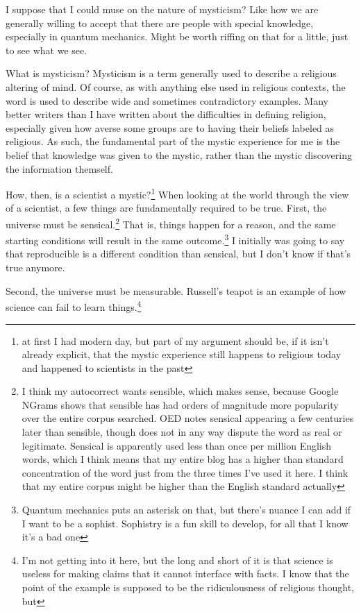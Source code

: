 \documentclass[12pt]{article}[titlepage]
\renewcommand{\,}{\textsuperscript{,}}
\begin{document}
I suppose that I could muse on the nature of mysticism?
Like how we are generally willing to accept that there are people with special knowledge, especially in quantum mechanics.
Might be worth riffing on that for a little, just to see what we see.

What is mysticism?
Mysticism is a term generally used to describe a religious altering of mind.
Of course, as with anything else used in religious contexts, the word is used to describe wide and sometimes contradictory examples.
Many better writers than I have written about the difficulties in defining religion, especially given how averse some groups are to having their beliefs labeled as religious.
As such, the fundamental part of the mystic experience for me is the belief that knowledge was given to the mystic, rather than the mystic discovering the information themself.

How, then, is a scientist a mystic?\footnote{at first I had modern day, but part of my argument should be, if it isn't already explicit, that the mystic experience still happens to religious today and happened to scientists in the past}
When looking at the world through the view of a scientist, a few things are fundamentally required to be true.
First, the universe must be sensical.\footnote{I think my autocorrect wants sensible, which makes sense, because Google NGrams shows that sensible has had orders of magnitude more popularity over the entire corpus searched. OED notes sensical appearing a few centuries later than sensible, though does not in any way dispute the word as real or legitimate. Sensical is apparently used less than once per million English words, which I think means that my entire blog has a higher than standard concentration of the word just from the three times I've used it here. I think that my entire corpus might be higher than the English standard actually}
That is, things happen for a reason, and the same starting conditions will result in the same outcome.\footnote{Quantum mechanics puts an asterisk on that, but there's nuance I can add if I want to be a sophist. Sophistry is a fun skill to develop, for all that I know it's a bad one}
I initially was going to say that reproducible is a different condition than sensical, but I don't know if that's true anymore.

Second, the universe must be measurable.
Russell's teapot is an example of how science can fail to learn things.\footnote{I'm not getting into it here, but the long and short of it is that science is useless for making claims that it cannot interface with facts.
I know that the point of the example is supposed to be the ridiculousness of religious thought, but}
\end{document}
